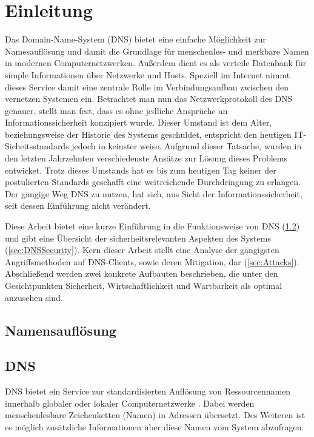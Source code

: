 \chapter{Einleitung}
Das Domain-Name-System (DNS) bietet eine einfache Möglichkeit zur Namesauflösung und damit die Grundlage für menschenles- und merkbare Namen in modernen Computernetzwerken. Außerdem dient es als verteile Datenbank für simple Informationen über Netzwerke und Hosts. Speziell im Internet nimmt dieses Service damit eine zentrale Rolle im Verbindungsaufbau zwischen den vernetzen Systemen ein. Betrachtet man nun das Netzwerkprotokoll des DNS genauer, stellt man fest, dass es ohne jedliche Ansprüche an Informationssicherheit konzipiert wurde. Dieser Umstand ist dem Alter, beziehungsweise der Historie des Systems geschuldet, entspricht den heutigen IT-Sicheitsstandards jedoch in keinster weise. Aufgrund dieser Tatsache, wurden in den letzten Jahrzehnten verschiedenste Ansätze zur Lösung dieses Problems entwicket. Trotz dieses Umstands hat es bis zum heutigen Tag keiner der postulierten Standards geschafft eine weitreichende Durchdringung zu erlangen. Der gängige Weg DNS zu nutzen, hat sich, aus Sicht der Informationssicherheit, seit dessen Einführung nicht verändert.



Diese Arbeit bietet eine kurze Einführung in die Funktionsweise von DNS (\ref{sec:DNS}) und gibt eine Übersicht der sicherheitsrelevanten Aspekten des Systems (\ref{sec:DNSSecurity}). Kern dieser Arbeit stellt eine Analyse der gängigsten Angriffsmethoden auf DNS-Clients, sowie deren Mitigation, dar (\ref{sec:Attacks}). Abschließend werden zwei konkrete Aufbauten beschrieben, die unter den Gesichtpunkten Sicherheit, Wirtschaftlichkeit und Wartbarkeit als optimal anzusehen sind. 

\section{Namensauflösung}

\section{DNS}
\label{sec:DNS}

DNS bietet ein Service zur standardisierten Auflösung von Ressourcennamen innerhalb globaler oder lokaler Computernetzwerke \cite{rfc1035}. Dabei werden menschenlesbare Zeichenketten (Namen) in Adressen übersetzt. Des Weiteren ist es möglich zusätzliche Informationen über diese Namen vom System abzufragen.

